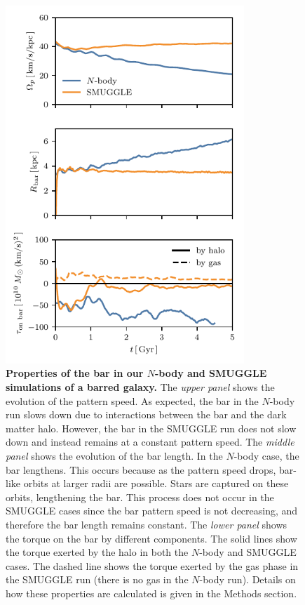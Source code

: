 \documentclass{natureprintstyle}
\newcommand{\Nbody}{$N$-body}
\begin{document}
\begin{figure}[h!]%
\centering
\includegraphics[width=9cm]{fig/fig2.pdf}
\caption{\textbf{Properties of the bar in our \boldmath$N$-body and SMUGGLE
simulations of a barred galaxy.} The \textit{upper panel} shows the evolution
of the pattern speed. As expected, the bar in the \Nbody{} run slows down due
to interactions between the bar and the dark matter halo. However, the bar in
the SMUGGLE run does not slow down and instead remains at a constant pattern
speed. The \textit{middle panel} shows the evolution of the bar length. In the
\Nbody{} case, the bar lengthens. This occurs because as the pattern speed
drops, bar-like orbits at larger radii are possible. Stars are captured on
these orbits, lengthening the bar. This process does not occur in the SMUGGLE
cases since the bar pattern speed is not decreasing, and therefore the bar
length remains constant. The \textit{lower panel} shows the torque on the bar
by different components. The solid lines show the torque exerted by the halo
in both the \Nbody{} and SMUGGLE cases. The dashed line shows the torque
exerted by the gas phase in the SMUGGLE run (there is no gas in the \Nbody{}
run). Details on how these properties are calculated is given in the Methods
section.}\label{fig:prop}
\end{figure}
\end{document}
